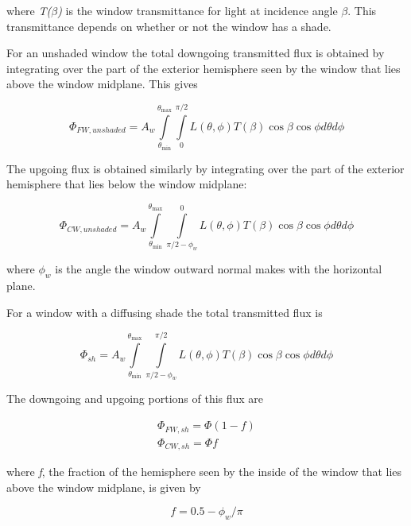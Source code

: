 where \emph{T($\beta$)} is the window transmittance for light at incidence angle \emph{$\beta$}. This transmittance depends on whether or not the window has a shade.

For an unshaded window the total downgoing transmitted flux is obtained by integrating over the part of the exterior hemisphere seen by the window that lies above the window midplane. This gives

\begin{equation}
{\Phi_{FW,unshaded}} = {A_w}\int\limits_{{\theta_{\min }}}^{{\theta_{\max }}} {\int\limits_0^{\pi /2} {L(\theta ,\phi )T(\beta )\cos \beta \cos \phi d\theta d\phi } }
\end{equation}

The upgoing flux is obtained similarly by integrating over the part of the exterior hemisphere that lies below the window midplane:

\begin{equation}
{\Phi_{CW,unshaded}} = {A_w}\int\limits_{{\theta_{\min }}}^{{\theta_{\max }}} {\int\limits_{\pi /2 - {\phi_w}}^0 {L(\theta ,\phi )T(\beta )\cos \beta \cos \phi d\theta d\phi } }
\end{equation}

where \({\phi_w}\) is the angle the window outward normal makes with the horizontal plane.

For a window with a diffusing shade the total transmitted flux is

\begin{equation}
{\Phi_{sh}} = {A_w}\int\limits_{{\theta_{\min }}}^{{\theta_{\max }}} {\int\limits_{\pi /2 - {\phi_w}}^{\pi /2} {L(\theta ,\phi )T(\beta )\cos \beta \cos \phi d\theta d\phi } }
\end{equation}

The downgoing and upgoing portions of this flux are

\begin{equation}
\begin{array}{l}
    \Phi_{FW,sh} = \Phi (1 - f) \\
    \Phi_{CW,sh} = \Phi f
\end{array}
\end{equation}

where \emph{f}, the fraction of the hemisphere seen by the inside of the window that lies above the window midplane, is given by

\begin{equation}
f = 0.5 - {\phi_w}/\pi
\end{equation}

